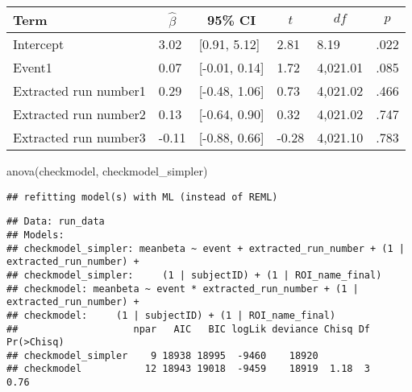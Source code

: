 \documentclass[
]{article}
\newenvironment{Shaded}{\begin{snugshade}}{\end{snugshade}}
\newcommand{\FunctionTok}[1]{\textcolor[rgb]{0.00,0.00,0.00}{#1}}
\newcommand{\NormalTok}[1]{#1}
\begin{document}
\begin{table}[tbp]

\begin{center}
\begin{threeparttable}

\caption{\label{tab:unnamed-chunk-9}}

\begin{tabular}{llllll}
\toprule
Term & \multicolumn{1}{c}{$\hat{\beta}$} & \multicolumn{1}{c}{95\% CI} & \multicolumn{1}{c}{$t$} & \multicolumn{1}{c}{$\mathit{df}$} & \multicolumn{1}{c}{$p$}\\
\midrule
Intercept & 3.02 & {}[0.91, 5.12] & 2.81 & 8.19 & .022\\
Event1 & 0.07 & {}[-0.01, 0.14] & 1.72 & 4,021.01 & .085\\
Extracted run number1 & 0.29 & {}[-0.48, 1.06] & 0.73 & 4,021.02 & .466\\
Extracted run number2 & 0.13 & {}[-0.64, 0.90] & 0.32 & 4,021.02 & .747\\
Extracted run number3 & -0.11 & {}[-0.88, 0.66] & -0.28 & 4,021.10 & .783\\
\bottomrule
\end{tabular}

\end{threeparttable}
\end{center}

\end{table}

\begin{Shaded}
\begin{Highlighting}[]
\FunctionTok{anova}\NormalTok{(checkmodel, checkmodel\_simpler)}
\end{Highlighting}
\end{Shaded}

\begin{verbatim}
## refitting model(s) with ML (instead of REML)
\end{verbatim}

\begin{verbatim}
## Data: run_data
## Models:
## checkmodel_simpler: meanbeta ~ event + extracted_run_number + (1 | extracted_run_number) + 
## checkmodel_simpler:     (1 | subjectID) + (1 | ROI_name_final)
## checkmodel: meanbeta ~ event * extracted_run_number + (1 | extracted_run_number) + 
## checkmodel:     (1 | subjectID) + (1 | ROI_name_final)
##                    npar   AIC   BIC logLik deviance Chisq Df Pr(>Chisq)
## checkmodel_simpler    9 18938 18995  -9460    18920                    
## checkmodel           12 18943 19018  -9459    18919  1.18  3       0.76
\end{verbatim}
\end{document}
